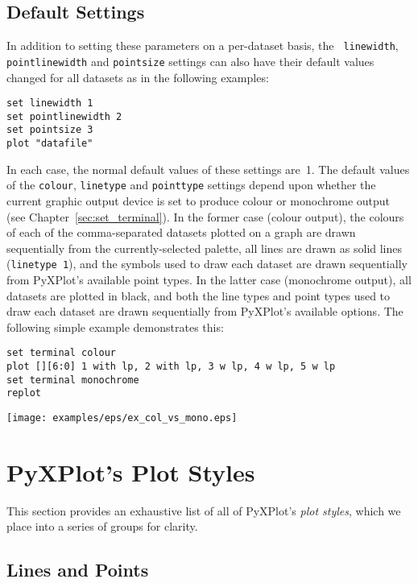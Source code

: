 \subsection{Default Settings}

In addition to setting these parameters on a per-dataset basis, the {\tt
linewidth}, {\tt pointlinewidth} and {\tt pointsize} settings can also have
their default values changed for all datasets as in the following examples:
\begin{verbatim}
set linewidth 1
set pointlinewidth 2
set pointsize 3
plot "datafile"
\end{verbatim}
In each case, the normal default values of these settings are~1. The default
values of the {\tt colour}, {\tt linetype} and {\tt pointtype} settings depend
upon whether the current graphic output device is set to produce colour or
monochrome output (see Chapter~\ref{sec:set_terminal}). In the former case
(colour output), the colours of each of the comma-separated datasets plotted on
a graph are drawn sequentially from the currently-selected palette, all lines
are drawn as solid lines ({\tt line\-type~1}), and the symbols used to draw
each dataset are drawn sequentially from PyXPlot's available point types. In
the latter case (monochrome output), all datasets are plotted in black, and
both the line types and point types used to draw each dataset are drawn
sequentially from PyXPlot's available options. The following simple example
demonstrates this:
\begin{verbatim}
set terminal colour
plot [][6:0] 1 with lp, 2 with lp, 3 w lp, 4 w lp, 5 w lp
set terminal monochrome
replot
\end{verbatim}
\centerline{\texttt{[image: examples/eps/ex\_col\_vs\_mono.eps]}}

\section{PyXPlot's Plot Styles}

This section provides an exhaustive list of all of PyXPlot's {\it plot styles},
which we place into a series of groups for clarity.

\subsection{Lines and Points}

